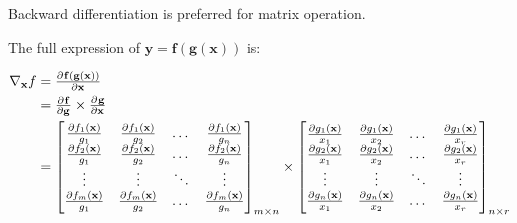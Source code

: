 Backward differentiation is preferred for matrix operation.



The full expression of $\mathbf{y}=\mathbf{f}(\mathbf{g}(\mathbf{x}))$ is:

\begin{equation}
\begin{aligned}
	\nabla{}_{\mathbf{x}} f &=  \pd{\mathbf{f}(\mathbf{g}(\mathbf{x}))}{\mathbf{x}} \\
	&= \pd{\mathbf{f}}{\mathbf{g}} \times \pd{\mathbf{g}}{\mathbf{x}} \\
	&= \left [ \begin{matrix}
\frac{\partial f_1({\mathbf{x}})}{g_1} & \frac{\partial f_1({\mathbf{x}})}{g_2} & \dots & \frac{\partial f_1({\mathbf{x}})}{g_n} \\
\frac{\partial f_2({\mathbf{x}})}{g_1} & \frac{\partial f_2({\mathbf{x}})}{g_2} & \dots & \frac{\partial f_2({\mathbf{x}})}{g_n} \\
\vdots & \vdots & \ddots & \vdots  \\
\frac{\partial f_m({\mathbf{x}})}{g_1} & \frac{\partial f_m({\mathbf{x}})}{g_2} & \dots & \frac{\partial f_m({\mathbf{x}})}{g_n}
\end{matrix} \right ]_{m \times n}
\times %
\left [ \begin{matrix}
\frac{\partial g_1({\mathbf{x}})}{x_1} & \frac{\partial g_1({\mathbf{x}})}{x_2} & \dots & \frac{\partial g_1({\mathbf{x}})}{x_r} \\
\frac{\partial g_2({\mathbf{x}})}{x_1} & \frac{\partial g_2({\mathbf{x}})}{x_2} & \dots & \frac{\partial g_2({\mathbf{x}})}{x_r} \\
\vdots & \vdots & \ddots & \vdots  \\
\frac{\partial g_n({\mathbf{x}})}{x_1} & \frac{\partial g_n({\mathbf{x}})}{x_2} & \dots & \frac{\partial g_n({\mathbf{x}})}{x_r}
\end{matrix} \right ]_{n \times r}
\end{aligned}
\end{equation}

